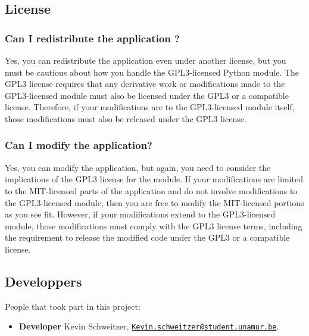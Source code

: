 \subsection{License}
\label{subsec:License}
\subsubsection{Can I redistribute the application ?}
Yes, you can redistribute the application even under another license, but you must be cautious about how you handle the GPL3-licensed Python module. The GPL3 license requires that any derivative work or modifications made to the GPL3-licensed module must also be licensed under the GPL3 or a compatible license. Therefore, if your modifications are to the GPL3-licensed module itself, those modifications must also be released under the GPL3 license.
\subsubsection{Can I modify the application?}
Yes, you can modify the application, but again, you need to consider the implications of the GPL3 license for the module. If your modifications are limited to the MIT-licensed parts of the application and do not involve modifications to the GPL3-licensed module, then you are free to modify the MIT-licensed portions as you see fit. However, if your modifications extend to the GPL3-licensed module, those modifications must comply with the GPL3 license terms, including the requirement to release the modified code under the GPL3 or a compatible license.
\subsection{Developpers}
People that took part in this project: 
\begin{itemize}
    \item \textbf{Developer} Kevin Schweitzer, \href{mailto:Kevin.schweitzer@student.unamur.be}{\nolinkurl{Kevin.schweitzer@student.unamur.be}}.
\end{itemize}
